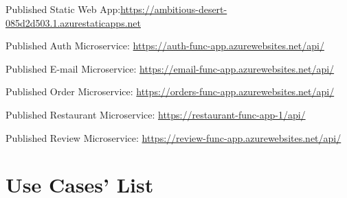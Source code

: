 Published Static Web App:\newline \url{https://ambitious-desert-085d2d503.1.azurestaticapps.net}\label{StaticWebAppLink}

Published Auth Microservice: \url{https://auth-func-app.azurewebsites.net/api/}\label{AuthMs}

Published E-mail Microservice: \url{https://email-func-app.azurewebsites.net/api/}\label{EmailMs}

Published Order Microservice: \url{https://orders-func-app.azurewebsites.net/api/}\label{OrderMs}

Published Restaurant Microservice: \url{https://restaurant-func-app-1/api/}\label{RestaurantMs}

Published Review Microservice: \url{https://review-func-app.azurewebsites.net/api/}\label{ReviewMs}

\newpage

\section{Use Cases' List}\label{usecases}

